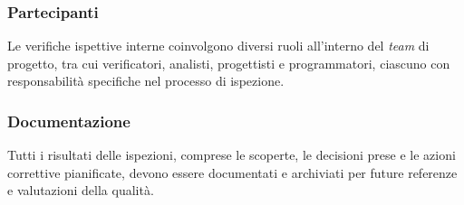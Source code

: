 \subsubsection{Partecipanti}
Le verifiche ispettive interne coinvolgono diversi ruoli all'interno del \textit{team}
di progetto, tra cui verificatori, analisti, progettisti e programmatori,
ciascuno con responsabilità specifiche nel processo di ispezione.

\subsubsection{Documentazione}
Tutti i risultati delle ispezioni, comprese le scoperte, le decisioni prese e
le azioni correttive pianificate, devono essere documentati e archiviati per
future referenze e valutazioni della qualità.

